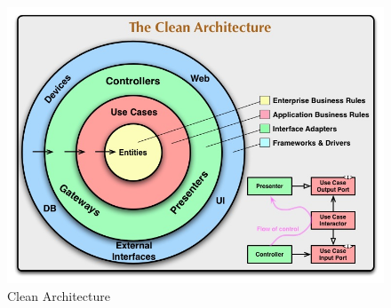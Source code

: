 \begin{figure}
    \centering
    \includegraphics[width=\textwidth]{assets/clean_architecture.jpg}
    \caption{Clean Architecture }
    \label{fig:clean_architecture}
\end{figure}
